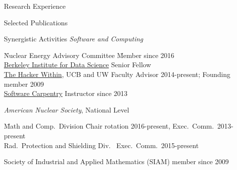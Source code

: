\documentclass{resume3} %
\begin{document}
\begin{rSection}{Research Experience}
%

\end{rSection}

\begin{rSection}{Selected Publications}

\end{rSection}

\vspace*{0.5em}
\begin{rSection}{Synergistic Activities}
\vspace*{-.5em}
\textit{Software and Computing}
\begin{tabbing}
\hspace*{2 em}\= Nuclear Energy Advisory Committee \hspace*{3em} \= Member since 2016\\
%
\>\href{http://bids.berkeley.edu/}{Berkeley Institute for Data Science} \> Senior Fellow\\
%
\> \href{http://thehackerwithin.github.io/berkeley/}{The Hacker Within}, UCB and UW  \> Faculty Advisor 2014-present; Founding member 2009\\
%
\> \href{http://software-carpentry.org/}{Software Carpentry}  \> Instructor since 2013%
%
\end{tabbing}
%
\textit{American Nuclear Society}, National Level
\begin{tabbing}
\hspace*{2 em}\= Math and Comp.\ Division \hspace*{6em} \= Chair rotation 2016-present, Exec.\ Comm.\ 2013-present \\
%
\> Rad.\ Protection and Shielding Div.\ \> Exec.\ Comm.\ 2015-present\\
\end{tabbing}

Society of Industrial and Applied Mathematics (SIAM) member since 2009 
\end{rSection}
\end{document}
